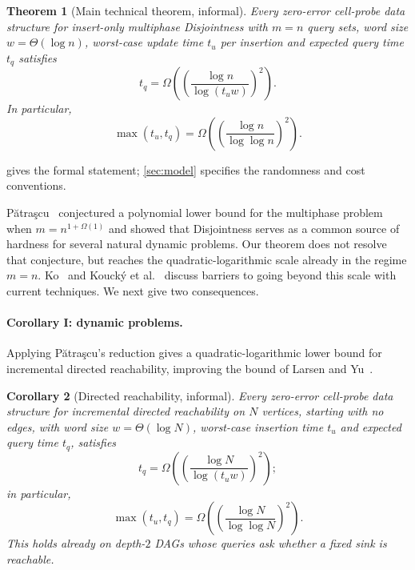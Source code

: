 \documentclass[11pt]{article}
\theoremstyle{plain}
\newtheorem{theorem}{Theorem}[section]
\newtheorem{corollary}[theorem]{Corollary}
\theoremstyle{definition}
\theoremstyle{remark}
\newcommand{\Patrascu}{P\u{a}tra\c{s}cu\xspace}
\begin{document}
\begin{samepage}
\begin{theorem}[Main technical theorem, informal]\label{thm:main-informal}
Every zero-error cell-probe data structure for insert-only multiphase Disjointness with $m=n$ query sets, word size $w=\Theta(\log n)$, worst-case update time $t_u$ per insertion and expected query time $t_q$ satisfies
\[
t_q=\Omega\!\left(\left(\frac{\log n}{\log(t_u w)}\right)^2\right).
\]
In particular,
\[
\max(t_u,t_q)=\Omega\!\left(\left(\frac{\log n}{\log\log n}\right)^2\right).
\]
\end{theorem}
\end{samepage}

\noindent {} gives the formal statement; \cref{sec:model} specifies the randomness and cost conventions.

\Patrascu~\cite{patrascu_mihai_towards_2010} conjectured a polynomial lower bound for the multiphase problem when $m=n^{1+\Omega(1)}$ and showed that Disjointness serves as a common source of hardness for several natural dynamic problems. Our theorem does not resolve that conjecture, but reaches the quadratic-logarithmic scale already in the regime $m=n$. Ko~\cite{ko_omega_2026} and Kouck\'y et al.~\cite{koucky_natural_2026} discuss barriers to going beyond this scale with current techniques. We next give two consequences.

\begin{samepage}
\paragraph{Corollary I: dynamic problems.}
Applying \Patrascu's reduction gives a quadratic-logarithmic lower bound for incremental directed reachability, improving the bound of Larsen and Yu~\cite{larsen_super-logarithmic_2025}.

\begin{corollary}[Directed reachability, informal]\label{thm:reach-informal}
Every zero-error cell-probe data structure for incremental directed reachability on $N$ vertices, starting with no edges, with word size $w=\Theta(\log N)$, worst-case insertion time $t_u$ and expected query time $t_q$, satisfies
\[
t_q=\Omega\!\left(\left(\frac{\log N}{\log(t_u w)}\right)^2\right);
\]
in particular,
\[
\max(t_u,t_q)=\Omega\!\left(\left(\frac{\log N}{\log\log N}\right)^2\right).
\]
This holds already on depth-$2$ DAGs whose queries ask whether a fixed sink is reachable.
\end{corollary}
\end{samepage}
\end{document}

